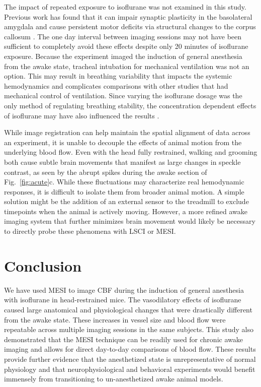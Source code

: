 \documentclass[12pt]{spieman}
\begin{document}
\begin{spacing}{2}
The impact of repeated exposure to isoflurane was not examined in this study. Previous work has found that it can impair synaptic plasticity in the basolateral amygdala \cite{Long:2016ri} and cause persistent motor deficits via structural changes to the corpus callosum \cite{Bajwa:2018ri}. The one day interval between imaging sessions may not have been sufficient to completely avoid these effects despite only 20 minutes of isoflurane exposure. Because the experiment imaged the induction of general anesthesia from the awake state, tracheal intubation for mechanical ventilation was not an option. This may result in breathing variability that impacts the systemic hemodynamics and complicates comparisons with other studies that had mechanical control of ventilation. Since varying the isoflurane dosage was the only method of regulating breathing stability, the concentration dependent effects of isoflurane may have also influenced the results \cite{Masamoto:2009dd,Li:2014eh}.

While image registration can help maintain the spatial alignment of data across an experiment, it is unable to decouple the effects of animal motion from the underlying blood flow. Even with the head fully restrained, walking and grooming both cause subtle brain movements that manifest as large changes in speckle contrast, as seen by the abrupt spikes during the awake section of Fig.~\ref{fig:acute}c. While these fluctuations may characterize real hemodynamic responses, it is difficult to isolate them from broader animal motion. A simple solution might be the addition of an external sensor to the treadmill \cite{Dombeck:2007gr} to exclude timepoints when the animal is actively moving. However, a more refined awake imaging system that further minimizes brain movement would likely be necessary to directly probe these phenomena with LSCI or MESI.


\section{Conclusion}
\label{sect:conclusion}

We have used MESI to image CBF during the induction of general anesthesia with isoflurane in head-restrained mice. The vasodilatory effects of isoflurane caused large anatomical and physiological changes that were drastically different from the awake state. These increases in vessel size and blood flow were repeatable across multiple imaging sessions in the same subjects. This study also demonstrated that the MESI technique can be readily used for chronic awake imaging and allows for direct day-to-day comparisons of blood flow. These results provide further evidence that the anesthetized state is unrepresentative of normal physiology and that neurophysiological and behavioral experiments would benefit immensely from transitioning to un-anesthetized awake animal models.



\end{spacing}
\end{document}
